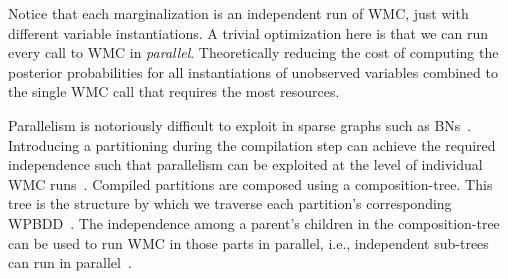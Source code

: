 Notice that each marginalization is an independent run of WMC, just with different variable instantiations. A trivial optimization here is that we can run every call to WMC in \emph{parallel}. Theoretically reducing the cost of computing the posterior probabilities for all instantiations of unobserved variables combined to the single WMC call that requires the most resources.

Parallelism is notoriously difficult to exploit in sparse graphs such as BNs~\cite{dal2014fast,ceylan2021open}. Introducing a partitioning during the compilation step can achieve the required independence such that parallelism can be exploited at the level of individual WMC runs~\cite{dal2017reducing}. Compiled partitions are composed using a composition-tree. This tree is the structure by which we traverse each partition's corresponding WPBDD~\cite{dal2021compositional}. The independence among a parent's children in the composition-tree can be used to run WMC in those parts in parallel, i.e., independent sub-trees can run in parallel~\cite{dal2018parallel}.


